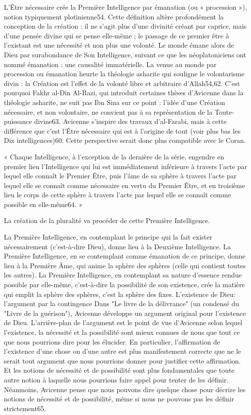 L'Être nécessaire crée la Première Intelligence par émanation (ou « procession »), notion typiquement plotinienne54. Cette définition altère profondément la conception de la création : il ne s'agit plus d'une divinité créant par caprice, mais d'une pensée divine qui se pense elle-même ; le passage de ce premier être à l'existant est une nécessité et non plus une volonté. Le monde émane alors de Dieu par surabondance de Son Intelligence, suivant ce que les néoplatoniciens ont nommé émanation : une causalité immatérielle. La venue au monde par procession ou émanation heurte la théologie asharite qui souligne le volontarisme divin : la Création est l'effet de la volonté libre et arbitraire d'Allah54,62. C'est pourquoi Fakhr al-Din Al-Razi, qui introduit certaines thèses d'Avicenne dans la théologie asharite, ne suit pas Ibn Sina sur ce point : l'idée d'une Création nécessaire, et non volontaire, ne convient pas à sa représentation de la Toute-puissance divine63. Avicenne s'inspire des travaux d'al-Farabi, mais à cette différence que c'est l'Être nécessaire qui est à l'origine de tout (voir plus bas les Dix intelligences)60. Cette perspective serait donc plus compatible avec le Coran.

« Chaque Intelligence, à l'exception de la dernière de la série, engendre en premier lieu l'Intelligence qui lui est immédiatement inférieure à travers l'acte par lequel elle connaît le Premier Être, puis l'âme de sa sphère à travers l'acte par lequel elle se connaît comme nécessaire en vertu du Premier Être, et en troisième lieu le corps de cette sphère à travers l'acte par lequel elle se connaît comme possible en elle-même64. »

La création de la pluralité va procéder de cette Première Intelligence.

La Première Intelligence, en contemplant le principe qui la fait exister nécessairement (c'est-à-dire Dieu), donne lieu à la Deuxième Intelligence.
La Première Intelligence, en se contemplant comme émanation de ce principe, donne lieu à la Première Âme, qui anime la sphère des sphères (celle qui contient toutes les autres).
La Première Intelligence, en contemplant sa nature d'essence rendue possible par elle-même, c'est-à-dire la possibilité de son existence, crée la matière qui emplit la sphère des sphères, c'est la sphère des fixes.
L'existence de Dieu: l'argument par la contingence
Dans "Le livre de la délivrance" (un condensé du "Livre de la guérison"), Avicenne développe un argument original pour l'existence de Dieu. L'arrière-plan de l'argument est le point de vue d'Avicenne selon lequel l'existence, la nécessité et la possibilité sont mieux connues de nous que tout ce que nous pourrions dire pour les élucider. En particulier, l'affirmation de l'existence d'une chose ou d'une autre est plus manifestement correcte que ne le serait tout argument que nous pourrions donner pour justifier cette affirmation. Et les notions de nécessité et de possibilité sont plus fondamentales que toute autre notion à laquelle nous pourrions faire appel pour tenter de les définir. Néanmoins, Avicenne pense que nous pouvons dire quelque chose pour décrire les notions de nécessité et de possibilité, même si nous ne pouvons pas les définir strictement65.

